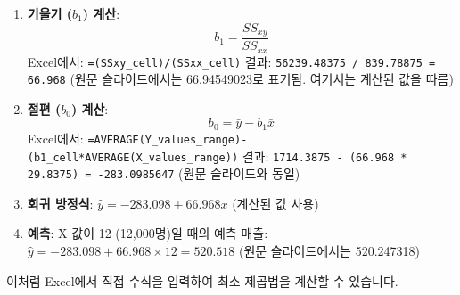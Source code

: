 \documentclass[11pt,a4paper]{article}
\theoremstyle{definition}
\begin{document}
\begin{tcolorbox}[examplebox, title=Excel 실습: 인구 및 매출 데이터]
\begin{enumerate}[label=\arabic*.]
    \item \textbf{기울기 ($b_1$) 계산}:
    \begin{equation*}
    b_1 = \frac{SS_{xy}}{SS_{xx}}
    \end{equation*}
    Excel에서: \texttt{=(SSxy_cell)/(SSxx_cell)}
    결과: \texttt{56239.48375 / 839.78875 = 66.968} (원문 슬라이드에서는 66.94549023로 표기됨. 여기서는 계산된 값을 따름)

    \item \textbf{절편 ($b_0$) 계산}:
    \begin{equation*}
    b_0 = \bar{y} - b_1\bar{x}
    \end{equation*}
    Excel에서: \texttt{=AVERAGE(Y_values_range)-(b1_cell*AVERAGE(X_values_range))}
    결과: \texttt{1714.3875 - (66.968 * 29.8375) = -283.0985647} (원문 슬라이드와 동일)

    \item \textbf{회귀 방정식}:
    $\hat{y} = -283.098 + 66.968x$ (계산된 값 사용)

    \item \textbf{예측}: X 값이 12 (12,000명)일 때의 예측 매출:
    $\hat{y} = -283.098 + 66.968 \times 12 = 520.518$ (원문 슬라이드에서는 520.247318)
\end{enumerate}
이처럼 Excel에서 직접 수식을 입력하여 최소 제곱법을 계산할 수 있습니다.


\end{tcolorbox}
\end{document}
